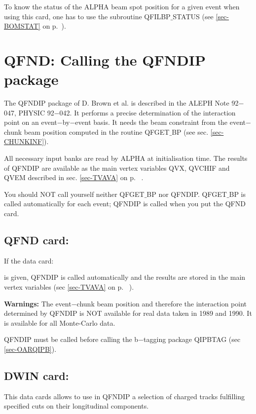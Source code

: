 To know the status of the ALPHA beam spot position for a given event when using this card, one has to use
the subroutine QFILBP$\_$STATUS (see \ref{sec-BOMSTAT} on p.~\pageref{sec-BOMSTAT}).


\section{\label{sec-DCQFND}QFND: Calling the QFNDIP package}
\par
     The QFNDIP package of D. Brown et al. is described in the ALEPH Note 92$-$047,  PHYSIC 92$-$042.
 It  performs a precise determination of
the interaction point on an event$-$by$-$event basis. It needs the beam constraint
from the event$-$chunk beam position computed in the routine QFGET$\_$BP (see sec. \ref{sec-CHUNKINF}).
\par
All necessary input banks are read by ALPHA at initialisation time.
The results of QFNDIP are available as the
main vertex variables  QVX, QVCHIF and QVEM described in sec. \ref{sec-TVAVA} on p. ~\pageref{sec-TVAVA}.
\par
You should NOT call yourself neither QFGET$\_$BP nor QFNDIP. QFGET$\_$BP is called
automatically for each event; QFNDIP is called when you put the QFND card.

\subsection{QFND card:}

If the data card:
\begin{indentlist}{ 2.50cm}{ 2.75cm}
is given, QFNDIP is called automatically and the results are stored in the
main vertex variables    (sec \ref{sec-TVAVA} on p. ~\pageref{sec-TVAVA}).
\end{indentlist}
\par
  {\bf Warnings:} 
  The event$-$chunk beam position
and  therefore the interaction point determined by QFNDIP is NOT available for real data
taken in 1989 and 1990. It is available for all Monte-Carlo data.
 
              QFNDIP must be called before calling the b$-$tagging package QIPBTAG (sec \ref{sec-OARQIPB}).

\subsection{DWIN card:}
\par

This data cards allows to use in QFNDIP a selection of charged tracks fulfilling specified cuts on
their longitudinal components.

